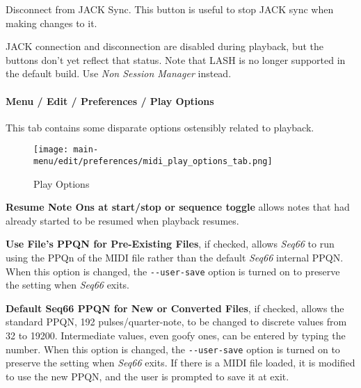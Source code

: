    Disconnect from JACK Sync.
   This button is useful to stop JACK sync when making changes to it.


   JACK connection and disconnection are disabled during playback, but the
   buttons don't yet reflect that status.
   Note that LASH is no longer supported in the default build.
   Use \textsl{Non Session Manager} instead.

\paragraph{Menu / Edit / Preferences / Play Options}
\label{paragraph:menu_edit_preferences_play_options}

   This tab contains some disparate options ostensibly related to playback.

\begin{figure}[H]
   \centering 
   \texttt{[image: main-menu/edit/preferences/midi\_play\_options\_tab.png]}
   \caption{Play Options}
   \label{fig:midi_play_options_tab}
\end{figure}

   \setcounter{ItemCounter}{0}      %

   \textbf{Resume Note Ons at start/stop or sequence toggle}
   allows notes that had already started
   to be resumed when playback resumes.

   \textbf{Use File's PPQN for Pre-Existing Files}, if checked, allows
   \textsl{Seq66} to run using the PPQn of the MIDI file rather than
   the default \textsl{Seq66} internal PPQN.
   When this option is changed, the \texttt{-{}-user-save} option is turned on
   to preserve the setting when \textsl{Seq66} exits.

   \textbf{Default Seq66 PPQN for New or Converted Files}, if checked, allows
   the standard PPQN, 192 pulses/quarter-note, to be changed to discrete values
   from 32 to 19200.  Intermediate values, even goofy ones, can be entered
   by typing the number.
   When this option is changed, the \texttt{-{}-user-save} option is turned on
   to preserve the setting when \textsl{Seq66} exits.
   If there is a MIDI file loaded, it is modified to use the new PPQN, and the
   user is prompted to save it at exit.

